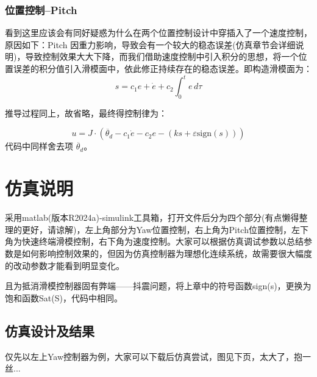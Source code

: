 \documentclass[12pt]{article}
\begin{document}
        \subsubsection{位置控制--Pitch}
        看到这里应该会有同好疑惑为什么在两个位置控制设计中穿插入了一个速度控制，原因如下：Pitch 因重力影响，导致会有一个较大的稳态误差(仿真章节会详细说明)，导致控制效果大大下降，而我们借助速度控制中引入积分的思想，将一个位置误差的积分值引入滑模面中，依此修正持续存在的稳态误差。即构造滑模面为：
            \begin{equation}
                s = c_1 e + \dot{e} + c_2 \int_0^t e\, d\tau
                \label{eq:s_8}
            \end{equation}
        \par
        推导过程同上，故省略，最终得控制律为：

        \begin{equation}
            u = J \cdot (\ddot{\theta_d} - c_1 \dot{e} - c_2 e - (k s + \varepsilon \text{sign}(s)))
            \label{eq:s_9}
        \end{equation}
        代码中同样舍去项 $\ddot{\theta_d}$。
\newpage

\section{仿真说明}
采用matlab(版本R2024a)-simulink工具箱，打开文件后分为四个部分(有点懒得整理的更好，请谅解)，左上角部分为Yaw位置控制，右上角为Pitch位置控制，左下角为快速终端滑模控制，右下角为速度控制。大家可以根据仿真调试参数以总结参数是如何影响控制效果的，但因为仿真控制器为理想化连续系统，故需要很大幅度的改动参数才能看到明显变化。
\par
且为抵消滑模控制器固有弊端——抖震问题，将上章中的符号函数sign(s)，更换为饱和函数Sat(S)，代码中相同。

    \subsection{仿真设计及结果}
    仅先以左上Yaw控制器为例，大家可以下载后仿真尝试，图见下页，太大了，抱一丝...
\end{document}
